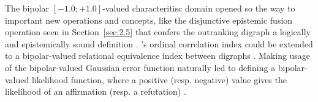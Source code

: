 The bipolar $[-1.0;+1.0]$-valued characteritisc domain opened so the way to important new operations and concepts, like the disjunctive epistemic fusion operation seen in Section~\vref{sec:2.5} that confers the outranking digraph a logically and epistemically sound definition \citep{BIS-2013}. \Kendall 's ordinal correlation index could be extended to a bipolar-valued relational equivalence index between digraphs \citep{BIS-2012a}. Making usage of the bipolar-valued Gaussian error function naturally led to defining a bipolar-valued likelihood function, where a positive (resp. negative) value gives the likelihood of an affirmation (resp. a refutation) \citep{BIS-2014}.      



%